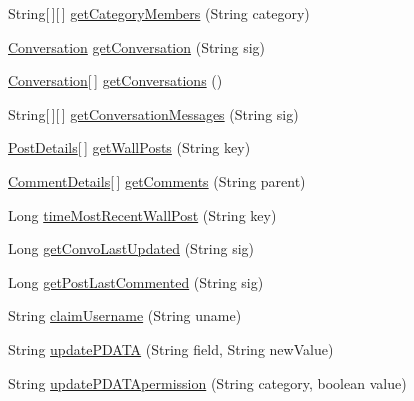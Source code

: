\begin{DoxyCompactItemize}
String\mbox{[}$\,$\mbox{]}\mbox{[}$\,$\mbox{]} \hyperlink{interfaceballmerpeak_1_1turtlenet_1_1client_1_1Turtlenet_a672211366da676547b6f23e7cab5b3d2}{get\-Category\-Members} (String category)
\item 
\hyperlink{classballmerpeak_1_1turtlenet_1_1shared_1_1Conversation}{Conversation} \hyperlink{interfaceballmerpeak_1_1turtlenet_1_1client_1_1Turtlenet_aee477261c671b6a20237d0fa8ddab7f0}{get\-Conversation} (String sig)
\item 
\hyperlink{classballmerpeak_1_1turtlenet_1_1shared_1_1Conversation}{Conversation}\mbox{[}$\,$\mbox{]} \hyperlink{interfaceballmerpeak_1_1turtlenet_1_1client_1_1Turtlenet_a2282dffbbc36f3398c0498c95629056f}{get\-Conversations} ()
\item 
String\mbox{[}$\,$\mbox{]}\mbox{[}$\,$\mbox{]} \hyperlink{interfaceballmerpeak_1_1turtlenet_1_1client_1_1Turtlenet_a6f2114b1e820a9c8fcfce3c9be6de12b}{get\-Conversation\-Messages} (String sig)
\item 
\hyperlink{classballmerpeak_1_1turtlenet_1_1shared_1_1PostDetails}{Post\-Details}\mbox{[}$\,$\mbox{]} \hyperlink{interfaceballmerpeak_1_1turtlenet_1_1client_1_1Turtlenet_a162a9e8f6101fc27d58a372735cd3702}{get\-Wall\-Posts} (String key)
\item 
\hyperlink{classballmerpeak_1_1turtlenet_1_1shared_1_1CommentDetails}{Comment\-Details}\mbox{[}$\,$\mbox{]} \hyperlink{interfaceballmerpeak_1_1turtlenet_1_1client_1_1Turtlenet_aeae3b123fbfea489eb6888dbc896aaca}{get\-Comments} (String parent)
\item 
Long \hyperlink{interfaceballmerpeak_1_1turtlenet_1_1client_1_1Turtlenet_a3859f33caf36133dbdb56c306e496f33}{time\-Most\-Recent\-Wall\-Post} (String key)
\item 
Long \hyperlink{interfaceballmerpeak_1_1turtlenet_1_1client_1_1Turtlenet_aef7a6b32445ad461aee9206782e7a23a}{get\-Convo\-Last\-Updated} (String sig)
\item 
Long \hyperlink{interfaceballmerpeak_1_1turtlenet_1_1client_1_1Turtlenet_afe7fb0ea0aa816d74bf768586a790920}{get\-Post\-Last\-Commented} (String sig)
\item 
String \hyperlink{interfaceballmerpeak_1_1turtlenet_1_1client_1_1Turtlenet_ae48f0a9d17c153ea02178f15921adbb3}{claim\-Username} (String uname)
\item 
String \hyperlink{interfaceballmerpeak_1_1turtlenet_1_1client_1_1Turtlenet_a7bd4e01c7a9b31062600215c190b2203}{update\-P\-D\-A\-T\-A} (String field, String new\-Value)
\item 
String \hyperlink{interfaceballmerpeak_1_1turtlenet_1_1client_1_1Turtlenet_a169f35c3f487d0282c9cca1c69ef0864}{update\-P\-D\-A\-T\-Apermission} (String category, boolean value)

\end{DoxyCompactItemize}
